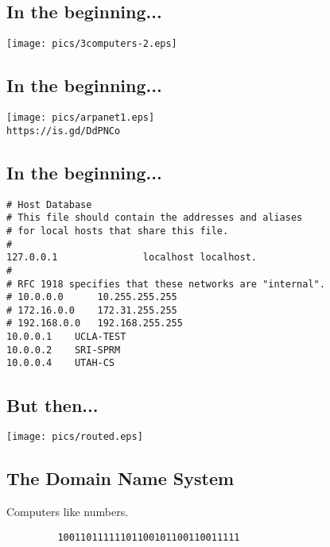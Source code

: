 \documentclass[xga]{xdvislides}
\begin{document}
\subsection{In the beginning...}
\vspace*{\fill}
\begin{center}
	\texttt{[image: pics/3computers-2.eps]} \\
\end{center}
\vspace*{\fill}

\subsection{In the beginning...}
\vspace*{\fill}
\begin{center}
	\texttt{[image: pics/arpanet1.eps]} \\
	{\tt https://is.gd/DdPNCo} \\
\end{center}
\vspace*{\fill}


\subsection{In the beginning...}
\begin{verbatim}
# Host Database
# This file should contain the addresses and aliases
# for local hosts that share this file.
#
127.0.0.1               localhost localhost.
#
# RFC 1918 specifies that these networks are "internal".
# 10.0.0.0      10.255.255.255
# 172.16.0.0    172.31.255.255
# 192.168.0.0   192.168.255.255
10.0.0.1	UCLA-TEST
10.0.0.2	SRI-SPRM
10.0.0.4	UTAH-CS
\end{verbatim}


\subsection{But then...}
\vspace*{\fill}
\begin{center}
	\texttt{[image: pics/routed.eps]} \\
\end{center}
\vspace*{\fill}

\subsection{The Domain Name System}
\vspace{.5in}
\begin{center}
	\Huge
	Computers like numbers. \\
\vspace{.5in}
\begin{verbatim}
         10011011111101100101100110011111
\end{verbatim}
\end{center}
\Normalsize
\end{document}
